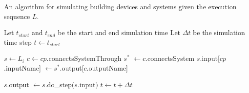 \begin{algorithm}[h]
\caption{An algorithm for simulating building devices and systems given the execution sequence $L$.}
\label{alg:simulation}

\begin{algorithmic}[1]
    \State Let $t_{start}$ and $t_{end}$ be the start and end simulation time
    \State Let $\Delta t$ be the simulation time step
    \State $t \gets t_{start}$
    
        \State $s \gets L_i$
                \State $c \gets c\!p$.connectsSystemThrough
                \State $s^*$ $\gets c$.connectsSystem
                \State $s$.input[$cp$.inputName] $\gets s^*$.output[$c$.outputName]
                
            \EndFor
            \State $s$.output $ \gets s$.do\_step$(s$.input$)$
        \EndFor
        \State $t \gets t + \Delta t$
    \EndWhile
\end{algorithmic}
\end{algorithm}
























